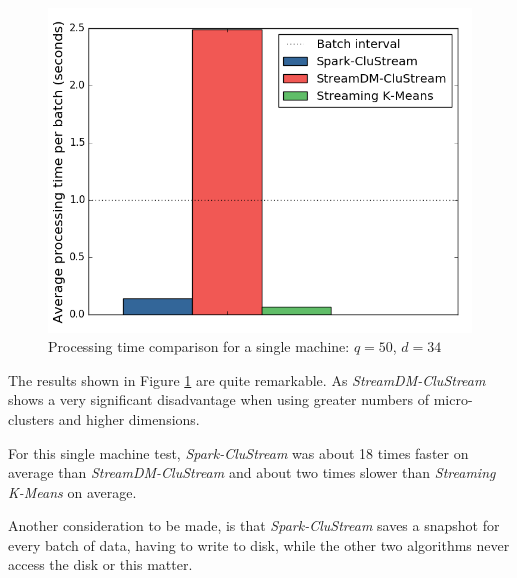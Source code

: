 \begin{figure}[h!]
 \centering
 \includegraphics[scale=0.47]{./styles/singlemachine.png}
 \caption{Processing time comparison for a single machine: $q=50$, $d=34$}
 \label{fig:singlemachine}
\end{figure}

The results shown in Figure \ref{fig:singlemachine} are quite remarkable. As \textit{StreamDM-CluStream} shows a very significant disadvantage when using greater numbers of micro-clusters and higher dimensions.

For this single machine test, \textit{Spark-CluStream} was about 18 times faster on average than \textit{StreamDM-CluStream} and about two times slower than \textit{Streaming K-Means} on average.

Another consideration to be made, is that  \textit{Spark-CluStream} saves a snapshot for every batch of data, having to write to disk, while the other two algorithms never access the disk or this matter.



